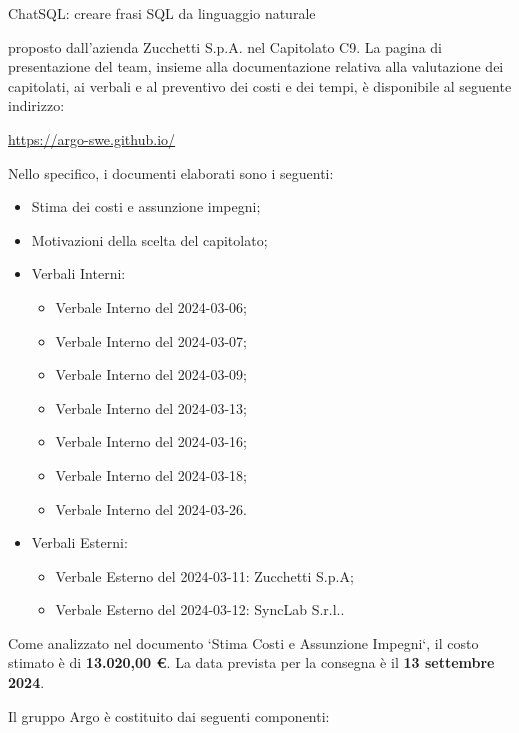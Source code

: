 \quad ChatSQL: creare frasi SQL da linguaggio naturale \newline

proposto dall’azienda Zucchetti S.p.A. nel Capitolato C9.
La pagina di presentazione del team, insieme alla documentazione relativa alla valutazione dei capitolati, ai verbali e al preventivo dei costi e dei tempi, è disponibile al seguente indirizzo: \newline

\quad \href{https://argo-swe.github.io/}{https://argo-swe.github.io/} \newline

Nello specifico, i documenti elaborati sono i seguenti: 
\begin{itemize}
    \item Stima dei costi e assunzione impegni;
    \item Motivazioni della scelta del capitolato; 
    \item Verbali Interni: 
    \begin{itemize}
        \item Verbale Interno del 2024-03-06;
        \item Verbale Interno del 2024-03-07;
        \item Verbale Interno del 2024-03-09;
        \item Verbale Interno del 2024-03-13;
        \item Verbale Interno del 2024-03-16;
        \item Verbale Interno del 2024-03-18;
        \item Verbale Interno del 2024-03-26.
    \end{itemize}
    \item Verbali Esterni:
    \begin{itemize}
        \item Verbale Esterno del 2024-03-11: Zucchetti S.p.A;
        \item Verbale Esterno del 2024-03-12: SyncLab S.r.l..
    \end{itemize}
\end{itemize}

Come analizzato nel documento ‘Stima Costi e Assunzione Impegni‘, il costo stimato è di \textbf{13.020,00 €}.
La data prevista per la consegna è il \textbf{13 settembre 2024}. \newline

Il gruppo Argo è costituito dai seguenti componenti: 

